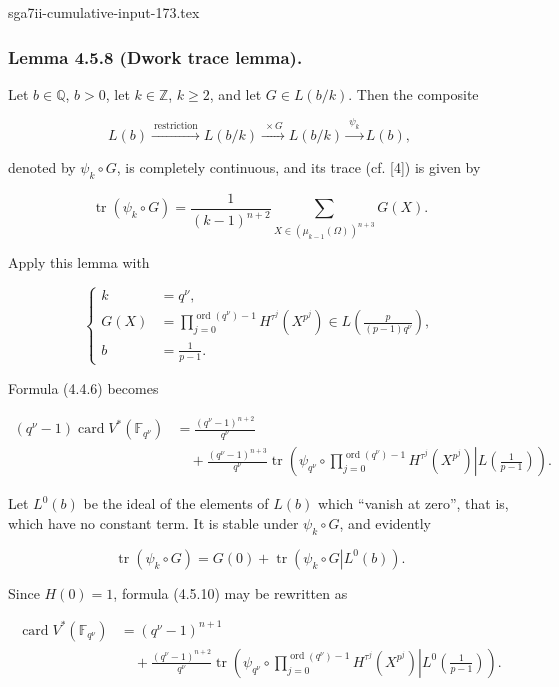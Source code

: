 \begin{filecontents*}{sga7ii-cumulative-input-173.tex}
\subsubsection*{Lemma 4.5.8 (Dwork trace lemma).}
Let $b\in\mathbb Q$, $b>0$, let $k\in\mathbb Z$, $k\geq2$, and let
$G\in L(b/k)$. Then the composite

\[
L(b)\xrightarrow{\ \text{restriction}\ }L(b/k)
\xrightarrow{\ \times G\ }L(b/k)
\xrightarrow{\ \psi_k\ }L(b),
\]

denoted by $\psi_k\circ G$, is completely continuous, and its trace
(cf. [4]) is given by

\begin{equation}\tag{4.5.9}
\operatorname{tr}(\psi_k\circ G)
=\frac1{(k-1)^{n+2}}
\sum_{X\in(\mu_{k-1}(\Omega))^{n+3}}G(X).
\end{equation}

Apply this lemma with

\[
\left\{
\begin{aligned}
k&=q^\nu,\\
G(X)&=\prod_{j=0}^{\operatorname{ord}(q^\nu)-1}
H^{\tau^j}(X^{p^j})
\in L\!\left(\frac{p}{(p-1)q^\nu}\right),\\
b&=\frac1{p-1}.
\end{aligned}
\right.
\]

Formula (4.4.6) becomes

\begin{equation}\tag{4.5.10}
\begin{aligned}
(q^\nu-1)\operatorname{card}V^*(\mathbb F_{q^\nu})
&=\frac{(q^\nu-1)^{n+2}}{q^\nu}\\
&\quad+\frac{(q^\nu-1)^{n+3}}{q^\nu}
\operatorname{tr}\!\left(
\left.\psi_{q^\nu}\circ
\prod_{j=0}^{\operatorname{ord}(q^\nu)-1}H^{\tau^j}(X^{p^j})
\right|L\!\left(\frac1{p-1}\right)\right).
\end{aligned}
\end{equation}

Let $L^0(b)$ be the ideal of the elements of $L(b)$ which ``vanish at
zero'', that is, which have no constant term. It is stable under
$\psi_k\circ G$, and evidently

\begin{equation}\tag{4.5.11}
\operatorname{tr}(\psi_k\circ G)
=G(0)+\operatorname{tr}\!\left(\left.\psi_k\circ G\right|L^0(b)\right).
\end{equation}

Since $H(0)=1$, formula (4.5.10) may be rewritten as

\begin{equation}\tag{4.5.12}
\begin{aligned}
\operatorname{card}V^*(\mathbb F_{q^\nu})
&=(q^\nu-1)^{n+1}\\
&\quad+\frac{(q^\nu-1)^{n+2}}{q^\nu}
\operatorname{tr}\!\left(
\left.\psi_{q^\nu}\circ
\prod_{j=0}^{\operatorname{ord}(q^\nu)-1}H^{\tau^j}(X^{p^j})
\right|L^0\!\left(\frac1{p-1}\right)\right).
\end{aligned}
\end{equation}
\end{filecontents*}
